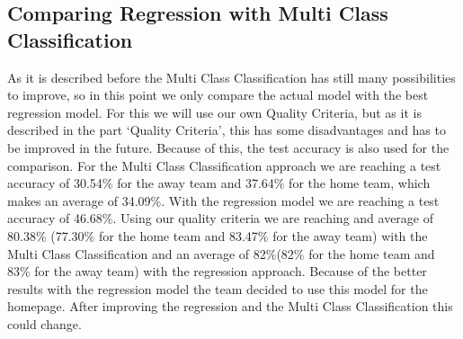 \subsection{Comparing Regression with Multi Class Classification}
As it is described before the Multi Class Classification has still many possibilities to improve, so in this point we only compare the actual model with the best regression model. For this we will use our own Quality Criteria, but as it is described in the part `Quality Criteria', this has some disadvantages and has to be improved in the future. Because of this, the test accuracy is also used for the comparison. For the Multi Class Classification approach we are reaching a test accuracy of 30.54\% for the away team and 37.64\% for the home team, which makes an average of 34.09\%. With the regression model we are reaching a test accuracy of 46.68\%. Using our quality criteria we are reaching and average of  80.38\% (77.30\% for the home team and 83.47\% for the away team) with the Multi Class Classification and an average of 82\%(82\% for the home team and 83\% for the away team) with the regression approach. Because of the better results with the regression model the team decided to use this model for the homepage. After improving the regression and the Multi Class Classification this could change. 